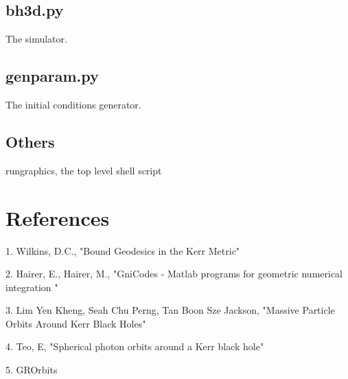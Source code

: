 \documentclass[11pt]{article}
\begin{document}
\subsection{bh3d.py}

The simulator.

\subsection{genparam.py}

The initial conditions generator.

\subsection{Others}

rungraphics, the top level shell script

\section{References}

1. Wilkins, D.C., "Bound Geodesics in the Kerr Metric"

2. Hairer, E., Hairer, M., "GniCodes - Matlab programs for geometric numerical integration "

3. Lim Yen Kheng, Seah Chu Perng, Tan Boon Sze Jackson, "Massive Particle Orbits Around Kerr Black Holes"

4. Teo, E, "Spherical photon orbits around a Kerr black hole"

5. GROrbits
\end{document}
